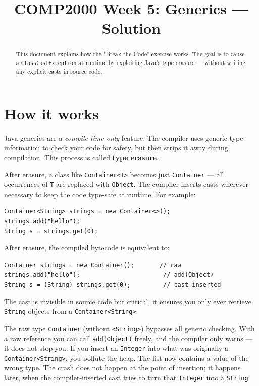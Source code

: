 \documentclass[twoside=false,DIV=14]{scrartcl}
\title{\color{redish} \vspace{-1em}COMP2000 Week 5: Generics --- Solution}
\begin{document}
{\color{blackish}\maketitle}\vspace{-7em}

\begin{abstract}
This document explains how the "Break the Code" exercise works.  The goal is to cause a \texttt{ClassCastException} at runtime by exploiting Java's type erasure --- without writing any explicit casts in source code.
\end{abstract}

\section*{How it works}

Java generics are a \emph{compile-time only} feature.  The compiler uses generic type information to check your code for safety, but then strips it away during compilation.  This process is called \textbf{type erasure}.

After erasure, a class like \texttt{Container<T>} becomes just \texttt{Container} --- all occurrences of \texttt{T} are replaced with \texttt{Object}.  The compiler inserts casts wherever necessary to keep the code type-safe at runtime.  For example:

\begin{lstlisting}
Container<String> strings = new Container<>();
strings.add("hello");
String s = strings.get(0);
\end{lstlisting}

After erasure, the compiled bytecode is equivalent to:

\begin{lstlisting}
Container strings = new Container();       // raw
strings.add("hello");                       // add(Object)
String s = (String) strings.get(0);         // cast inserted
\end{lstlisting}

The cast is invisible in source code but critical: it ensures you only ever retrieve \texttt{String} objects from a \texttt{Container<String>}.

The raw type \texttt{Container} (without \texttt{<String>}) bypasses all generic checking.  With a raw reference you can call \texttt{add(Object)} freely, and the compiler only warns --- it does not stop you.  If you insert an \texttt{Integer} into what was originally a \texttt{Container<String>}, you pollute the heap.  The list now contains a value of the wrong type.  The crash does not happen at the point of insertion; it happens later, when the compiler-inserted cast tries to turn that \texttt{Integer} into a \texttt{String}.
\end{document}
